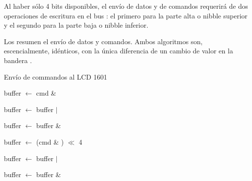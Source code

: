 Al haber sólo 4 bits disponibles, el envío de datos y de comandos requerirá de dos operaciones de escritura en el bus \IIC{}: el primero para la parte alta o nibble superior y el segundo para la parte baja o nibble inferior.

Los  resumen el envío de datos y comandos.
Ambos algoritmos son, escencialmente, idénticos, con la única diferencia de un cambio de valor en la bandera \RS{}.

\begin{algorithm}[H]
	\centering
	\caption{Envío de commandos al LCD 1601}%
	\label{alg:lcd-command-send}
	\begin{algorithmic}
			\State buffer $\leftarrow$ cmd \& 

			\State buffer $\leftarrow$ buffer $\vert$ 

			\State {}

			\State {}

			\State buffer $\leftarrow$ buffer \& 

			\State {}

			\medskip

			\State buffer $\leftarrow$ (cmd \& ) $\ll$ 4

			\State buffer $\leftarrow$ buffer $\vert$ 

			\State {}

			\State {}

			\State buffer $\leftarrow$ buffer \& 

			\State {}
		\EndProcedure{}
	\end{algorithmic}
\end{algorithm}

